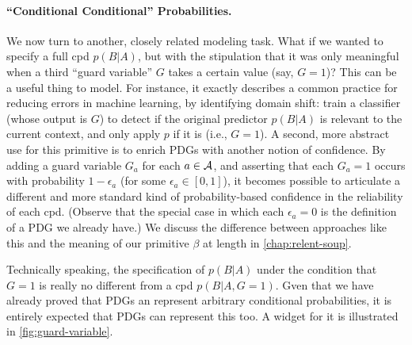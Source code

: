 \paragraph{``Conditional Conditional'' Probabilities.}
We now turn to another, closely related modeling task. 
What if we wanted to specify a full cpd $p(B|A)$, but with the stipulation that it was only meaningful when a third ``guard variable'' $G$ takes a certain value (say, $G{=}1$)?
This can be a useful thing to model. For instance, it exactly describes
    a common practice for reducing errors in machine learning, by identifying domain shift: train a classifier (whose output is $G$) to detect if the original predictor $p(B|A)$ is relevant to the current context, and only apply $p$ if it is (i.e., $G{=}1$).
A second, more abstract use for this primitive is to enrich PDGs with another notion of confidence. 
By adding a guard variable $G_a$ for each $a \in \mathcal A$, and asserting that each $G_a = 1$ occurs with probability $1 - \epsilon_a$ (for some $\epsilon_a \in [0,1]$), it becomes possible to articulate a different and more standard kind of probability-based confidence in the reliability of each cpd.
(Observe that the special case in which each $\epsilon_a= 0$ is the definition of a PDG we already have.)
We discuss the difference between approaches like this and the meaning of our primitive $\beta$ at length in \cref{chap:relent-soup}. 

Technically speaking, the specification of $p(B|A)$ under the condition that $G = 1$ is really no different from a cpd $p(B|A, G{=}1)$.
Gven that we have already proved that PDGs an represent arbitrary conditional probabilities, it is entirely expected that PDGs can represent this too. 
A widget for it is illustrated in \cref{fig:guard-variable}.

